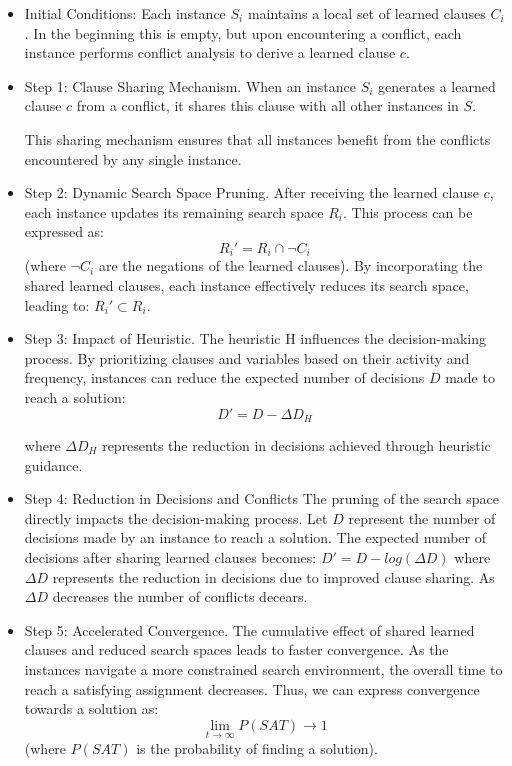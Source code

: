 \documentclass{article}
\begin{document}
\begin{itemize}
    \item Initial Conditions: Each instance $S_i$ maintains a local set of learned clauses $C_i$. In the beginning this is empty, but upon encountering a conflict, each instance performs conflict analysis to derive a learned clause $c$.
    \item Step 1: Clause Sharing Mechanism. When an instance $S_i$ generates a learned clause $c$ from a conflict, it shares this clause with all other instances in $S$. %

    This sharing mechanism ensures that all instances benefit from the conflicts encountered by any single instance.
    \item Step 2: Dynamic Search Space Pruning. After receiving the learned clause $c$, each instance updates its remaining search space $R_i$. This process can be expressed as: $$R_i' = R_i \cap \neg C_i$$ (where $\neg C_i$ are the negations of the learned clauses). By incorporating the shared learned clauses, each instance effectively reduces its search space, leading to: $R_i' \subset R_i$.
    \item  Step 3: Impact of Heuristic. The heuristic H influences the decision-making process. By prioritizing clauses and variables based on their activity and frequency, instances can reduce the expected number of decisions $D$ made to reach a solution:
    $$D' = D - \Delta D_H$$

    where $\Delta D_H$ represents the reduction in decisions achieved through heuristic guidance.
    \item Step 4: Reduction in Decisions and Conflicts
    The pruning of the search space directly impacts the decision-making process. Let $D$ represent the number of decisions made by an instance to reach a solution. The expected number of decisions after sharing learned clauses becomes: $D'=D - log(\Delta D)$
    where $\Delta D$ represents the reduction in decisions due to improved clause sharing. As $\Delta D$ decreases the number of conflicts decears.

    \item Step 5: Accelerated Convergence. The cumulative effect of shared learned clauses and reduced search spaces leads to faster convergence. As the instances navigate a more constrained search environment, the overall time to reach a satisfying assignment decreases. Thus, we can express convergence towards a solution as: $$ \lim_{t \rightarrow \infty}P(SAT) \rightarrow 1 $$ (where $P(SAT)$ is the probability of finding a solution).
\end{itemize}
\end{document}

